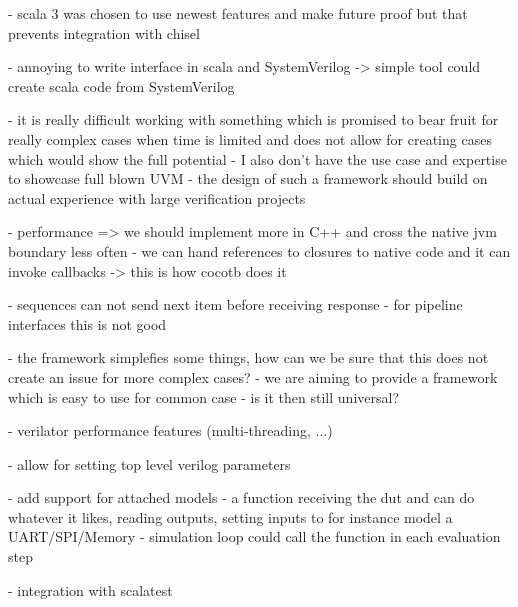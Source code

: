 - scala 3 was chosen to use newest features and make future proof but that prevents integration with chisel

- annoying to write interface in scala and SystemVerilog -> simple tool could create scala code from SystemVerilog

- it is really difficult working with something which is promised to bear fruit for really complex cases when time is
limited and does not allow for creating cases which would show the full potential
- I also don't have the use case and expertise to showcase full blown UVM
- the design of such a framework should build on actual experience with large verification projects

- performance => we should implement more in C++ and cross the native jvm boundary less often
- we can hand references to closures to native code and it can invoke callbacks -> this is how cocotb does it

- sequences can not send next item before receiving response
- for pipeline interfaces this is not good


- the framework simplefies some things, how can we be sure that this does not create an issue for more complex cases?
- we are aiming to provide a framework which is easy to use for common case 
- is it then still universal?


- verilator performance features (multi-threading, ...)

- allow for setting top level verilog parameters

- add support for attached models
- a function receiving the dut and can do whatever it likes, reading outputs, setting inputs to for instance model a
UART/SPI/Memory
- simulation loop could call the function in each evaluation step

- integration with scalatest


